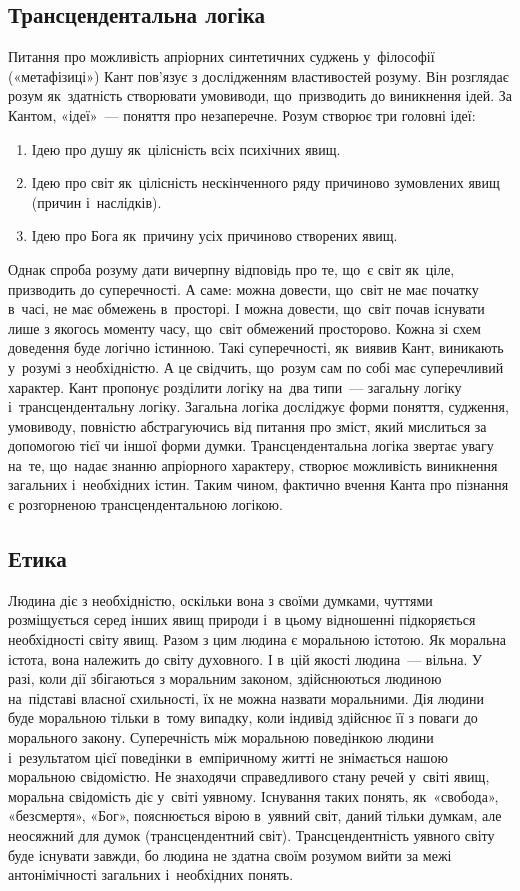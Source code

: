 \documentclass[a5paper,oneside,DIV=12,12pt,headings=small]{scrartcl}
\begin{document}
		\subsection{Трансцендентальна логіка}
			Питання про можливість апріорних синтетичних суджень у~філософії («метафізиці») Кант пов'язує з дослідженням властивостей розуму. Він розглядає розум як~здатність створювати умовиводи, що~призводить до виникнення ідей. За Кантом, «ідеї»~— поняття про незаперечне. Розум створює три головні ідеї:
			\begin{enumerate}
				\item Ідею про душу як~цілісність всіх психічних явищ.
				\item Ідею про світ як~цілісність нескінченного ряду причиново зумовлених явищ (причин і~наслідків).
				\item Ідею про Бога як~причину усіх причиново створених явищ.
			\end{enumerate}
			Однак спроба розуму дати вичерпну відповідь про те, що~є світ як~ціле, призводить до суперечності. А саме: можна довести, що~світ не має початку в~часі, не має обмежень в~просторі. І можна довести, що~світ почав існувати лише з якогось моменту часу, що~світ обмежений просторово. Кожна зі схем доведення буде логічно істинною. Такі суперечності, як~виявив Кант, виникають у~розумі з необхідністю. А це свідчить, що~розум сам по собі має суперечливий характер. Кант пропонує розділити логіку на~два типи~— загальну логіку і~трансцендентальну логіку. Загальна логіка досліджує форми поняття, судження, умовиводу, повністю абстрагуючись від питання про зміст, який мислиться за допомогою тієї чи іншої форми думки. Трансцендентальна логіка звертає увагу на~те, що~надає знанню апріорного характеру, створює можливість виникнення загальних і~необхідних істин. Таким чином, фактично вчення Канта про пізнання є розгорненою трансцендентальною логікою.
		
		\subsection{Етика}
			Людина діє з необхідністю, оскільки вона з своїми думками, чуттями розміщується серед інших явищ природи і~в цьому відношенні підкоряється необхідності світу явищ. Разом з цим людина є моральною істотою. Як моральна істота, вона належить до світу духовного. І в~цій якості людина~— вільна. У разі, коли дії збігаються з моральним законом, здійснюються людиною на~підставі власної схильності, їх не можна назвати моральними. Дія людини буде моральною тільки в~тому випадку, коли індивід здійснює її з поваги до морального закону. Суперечність між моральною поведінкою людини і~результатом цієї поведінки в~емпіричному житті не знімається нашою моральною свідомістю. Не знаходячи справедливого стану речей у~світі явищ, моральна свідомість діє у~світі уявному. Існування таких понять, як~«свобода», «безсмертя», «Бог», пояснюється вірою в~уявний світ, даний тільки думкам, але неосяжний для думок (трансцендентний світ). Трансцендентність уявного світу буде існувати завжди, бо людина не здатна своїм розумом вийти за межі антонімічності загальних і~необхідних понять.
			
\end{document}

